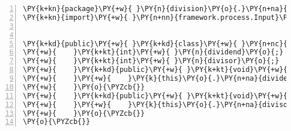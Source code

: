 \begin{Verbatim}[commandchars=\\\{\},numbers=left,firstnumber=1,stepnumber=1,frame=single,fontsize=\small]
\PY{k+kn}{package}\PY{+w}{ }\PY{n}{division}\PY{o}{.}\PY{n+na}{process}\PY{o}{;}
\PY{k+kn}{import}\PY{+w}{ }\PY{n+nn}{framework.process.Input}\PY{o}{;}


\PY{k+kd}{public}\PY{+w}{ }\PY{k+kd}{class}\PY{+w}{ }\PY{n+nc}{DividendAndDivisor}\PY{+w}{ }\PY{k+kd}{implements}\PY{+w}{ }\PY{n}{Input}\PY{+w}{ }\PY{o}{\PYZob{}}
\PY{+w}{    }\PY{k+kt}{int}\PY{+w}{ }\PY{n}{dividend}\PY{o}{;}
\PY{+w}{    }\PY{k+kt}{int}\PY{+w}{ }\PY{n}{divisor}\PY{o}{;}
\PY{+w}{    }\PY{k+kd}{public}\PY{+w}{ }\PY{k+kt}{void}\PY{+w}{ }\PY{n+nf}{setDividend}\PY{o}{(}\PY{k+kt}{int}\PY{+w}{ }\PY{n}{dividend}\PY{o}{)}\PY{+w}{ }\PY{o}{\PYZob{}}
\PY{+w}{    }\PY{+w}{    }\PY{k}{this}\PY{o}{.}\PY{n+na}{dividend}\PY{+w}{ }\PY{o}{=}\PY{+w}{ }\PY{n}{dividend}\PY{o}{;}
\PY{+w}{    }\PY{o}{\PYZcb{}}
\PY{+w}{    }\PY{k+kd}{public}\PY{+w}{ }\PY{k+kt}{void}\PY{+w}{ }\PY{n+nf}{setDivisor}\PY{o}{(}\PY{k+kt}{int}\PY{+w}{ }\PY{n}{divisor}\PY{o}{)}\PY{+w}{ }\PY{o}{\PYZob{}}
\PY{+w}{    }\PY{+w}{    }\PY{k}{this}\PY{o}{.}\PY{n+na}{divisor}\PY{+w}{ }\PY{o}{=}\PY{+w}{ }\PY{n}{divisor}\PY{o}{;}
\PY{+w}{    }\PY{o}{\PYZcb{}}
\PY{o}{\PYZcb{}}
\end{Verbatim}
